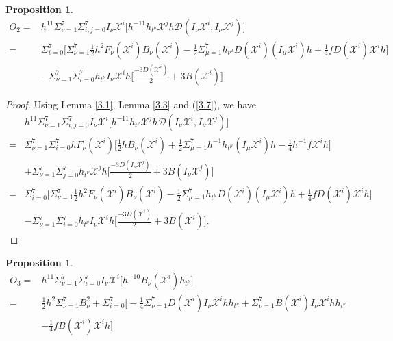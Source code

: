 \documentclass[reqno,12pt]{amsart}
\numberwithin{equation}{section}
\theoremstyle{plain}
\newtheorem{proposition}[theorem]{Proposition}
\theoremstyle{definition}
\begin{document}
\begin{proposition}
    \begin{equation}\label{3.18}
    \begin{aligned}
O_2=&h^{11}\Sigma_{\nu=1}^7\Sigma_{i,j=0}^7I_\nu \mathscr{X}^i\bigg[h^{-11}h_{t^\nu}\mathscr{X}^j h\mathcal{D}(I_\nu \mathscr{X}^i,I_\nu \mathscr{X}^j)\bigg]\\=&\Sigma_{i=0}^7\bigg[\Sigma_{\nu=1}^7\frac{1}{2}h^2F_\nu(\mathscr{X}^i)B_\nu (\mathscr{X}^i)-\frac{1}{2}\Sigma_{\mu=1}^7h_{t^\mu} D(\mathscr{X}^i) (I_\mu\mathscr{X}^i)h +\frac{1}{4}fD(\mathscr{X}^i)\mathscr{X}^i h \bigg]\\&
-\Sigma_{\nu=1}^7\Sigma_{i=0}^7h_{t^\nu}I_\nu\mathscr{X}^i h\bigg[\frac{-3D( \mathscr{X}^i)}{2}+3B(\mathscr{X}^i)\bigg]\end{aligned}
    \end{equation}
\end{proposition}
\begin{proof}
Using Lemma \ref{3.1}, Lemma \ref{3.3} and (\ref{3.7}), we have
     \begin{align*}
&h^{11}\Sigma_{\nu=1}^7\Sigma_{i,j=0}^7I_\nu \mathscr{X}^i\bigg[h^{-11}h_{t^\nu}\mathscr{X}^j h\mathcal{D}(I_\nu \mathscr{X}^i,I_\nu \mathscr{X}^j)\bigg]\\=&\Sigma_{\nu=1}^7\Sigma_{i=0}^7hF_\nu(\mathscr{X}^i) \bigg[\frac{1}{2} h B_\nu (\mathscr{X}^i)+\frac{1}{2}\Sigma_{\mu=1}^7 h^{-1}h_{t^\mu} (I_\mu\mathscr{X}^i)h -\frac{1}{4}h^{-1}f\mathscr{X}^i h \bigg]\\&+\Sigma_{\nu=1}^7\Sigma_{j=0}^7h_{t^\nu}\mathscr{X}^j h\bigg[\frac{-3D(I_\nu \mathscr{X}^j)}{2}+3B(I_\nu\mathscr{X}^j)\bigg] \\=&\Sigma_{i=0}^7\bigg[\Sigma_{\nu=1}^7\frac{1}{2}h^2F_\nu(\mathscr{X}^i)B_\nu (\mathscr{X}^i)-\frac{1}{2}\Sigma_{\mu=1}^7 h_{t^\mu}D(\mathscr{X}^i) (I_\mu\mathscr{X}^i)h +\frac{1}{4}fD(\mathscr{X}^i)\mathscr{X}^i h \bigg]\\&
-\Sigma_{\nu=1}^7\Sigma_{i=0}^7h_{t^\nu}I_\nu\mathscr{X}^i h\bigg[\frac{-3D( \mathscr{X}^i)}{2}+3B(\mathscr{X}^i)\bigg]. 
\end{align*}




\end{proof}






\begin{proposition}
\begin{equation}\label{3.19}
    \begin{aligned}
       O_3=& h^{11}\Sigma_{\nu=1}^7\Sigma_{i=0}^7I_\nu\mathscr{X}^i \bigg[h^{-10}B_\nu(\mathscr{X}^i)h_{t^\nu}\bigg]   \\=&\frac{1}{2}h^2\Sigma_{\nu=1}^7B_\nu^2 +\Sigma_{i=0}^7\bigg[-\frac{1}{4}\Sigma
_{\nu=1}^7D(\mathscr{X}^i)I_\nu\mathscr{X}^i h h_{t^\nu}+\Sigma_{\nu=1}^7B(\mathscr{X}^i)I_\nu{\mathscr{X}^i}hh_{t^\nu}\\&-\frac{1}{4}fB(\mathscr{X}^i)\mathscr{X}^i h\bigg]
       \end{aligned} 
       \end{equation}\end{proposition}
    
\end{document}
